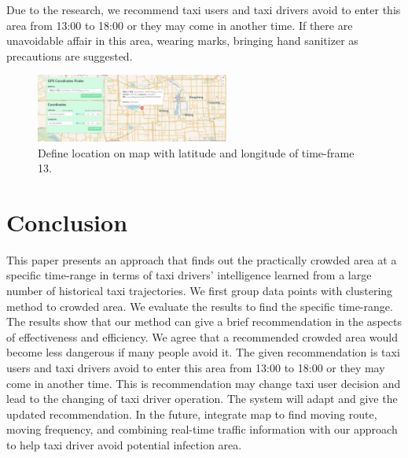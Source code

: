 \documentclass[journal]{IEEEtran}
\begin{document}
Due to the research, we recommend taxi users and taxi drivers avoid to enter this area from 13:00 to 18:00 or they may come in another time. If there are unavoidable affair in this area, wearing marks, bringing hand sanitizer as precautions are suggested.

\begin{figure}[!t]
	\centering
	\includegraphics[width=2.5in]{image/map_13.png}
	\caption{Define location on map with latitude and longitude of time-frame 13.}
	\label{fig_map_location13}
\end{figure}





\section{Conclusion}


This paper presents an approach that finds out the practically crowded area at a specific time-range in terms of taxi drivers’ intelligence learned from a large number of historical taxi trajectories. We first group data points with clustering method to crowded area. We evaluate the results to find the specific time-range. The results show that our method can give a brief recommendation in the aspects of effectiveness and efficiency. We agree that a recommended crowded area would become less dangerous if many people avoid it. The given recommendation is taxi users and taxi drivers avoid to enter this area from 13:00 to 18:00 or they may come in another time. This is recommendation may change taxi user decision and lead to the changing of taxi driver operation. The system will adapt and give the updated recommendation. In the future, integrate map to find moving route, moving frequency, and combining real-time traffic information with our approach to help taxi driver avoid potential infection area. 
\end{document}
